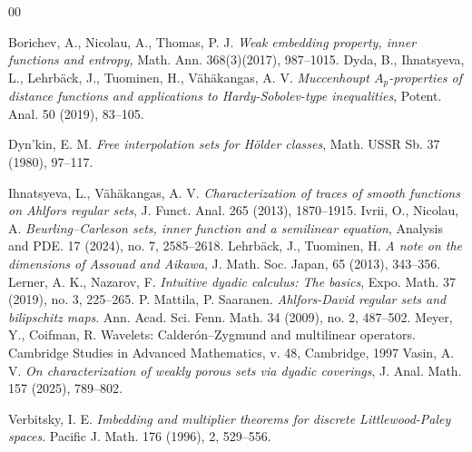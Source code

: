 \documentclass[12pt]{amsart} \setlength{\textwidth}{15cm} \setlength{\textheight}{24cm} \setlength{\voffset}{-1cm} \setlength{\oddsidemargin}{-0.4cm} \setlength{\evensidemargin}{-0.4cm}
\theoremstyle{definition}
\theoremstyle{remark}
\begin{document}







































\begin{thebibliography}{00}



Borichev, A., Nicolau, A.,  Thomas, P. J. \textit{Weak embedding property, inner functions and entropy,}
 Math. Ann. 368(3)(2017), 987--1015.
Dyda, B., Ihnatsyeva, L., Lehrb\"{a}ck, J., Tuominen, H.,    V\"{a}h\"{a}kangas, A. V.  \textit {Muccenhoupt $A_p$-properties of distance functions and applications to Hardy-Sobolev-type inequalities}, Potent. Anal. 50 (2019), 83--105.

Dyn'kin, E. M. \textit {Free interpolation sets for H\"{o}lder classes},
 Math. USSR Sb. 37 (1980), 97--117.

Ihnatsyeva, L.,  V\"{a}h\"{a}kangas, A. V. \textit{Characterization of traces of smooth functions on Ahlfors regular sets},
J. Funct. Anal. 265 (2013), 1870--1915.
Ivrii, O., Nicolau, A. \textit{Beurling--Carleson sets, inner function and a semilinear equation},
Analysis and  PDE.
 17 (2024), no. 7,  2585--2618.
 Lehrb{\"a}ck, J.,  Tuominen, H.
 \textit{A note on the dimensions of Assouad and Aikawa},
J. Math. Soc. Japan, 65 (2013), 343--356.
 Lerner, A. K.,  Nazarov, F.
\textit{Intuitive dyadic calculus: The basics},
Expo. Math.  37 (2019), no. 3, 225--265.
P. Mattila, P. Saaranen. \textit{ Ahlfors-David regular sets and bilipschitz maps}. Ann. Acad. Sci.
Fenn. Math. 34 (2009), no. 2, 487--502.
Meyer, Y.,    Coifman, R. Wavelets: Calder\'{o}n--Zygmund and
multilinear operators. Cambridge Studies in Advanced Mathematics, v. 48, Cambridge,
1997
 Vasin, A. V. \textit {On characterization of   weakly porous sets via dyadic coverings}, J. Anal. Math. 157 (2025),  789--802.


Verbitsky, I. E. \textit{Imbedding and multiplier theorems for discrete Littlewood-Paley spaces}.
Pacific J. Math.  176 (1996),  2, 529--556.
\end{thebibliography}
\end{document}

